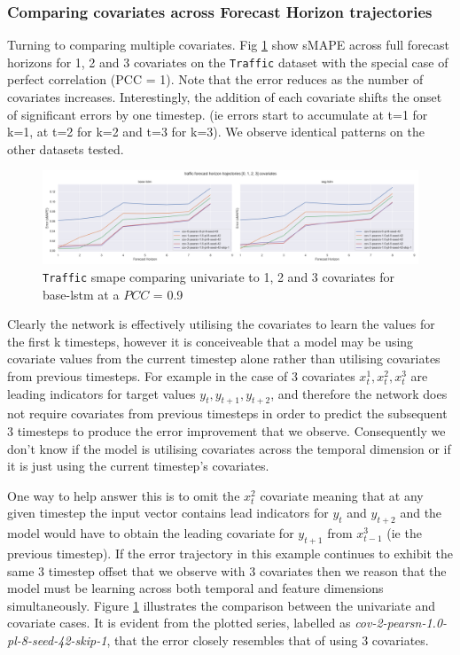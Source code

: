 \documentclass[letterpaper]{article}
\newcommand{\pearson}{PCC}
\begin{document}
\subsubsection{Comparing covariates across Forecast Horizon trajectories}
Turning to comparing multiple covariates. Fig \ref{fig:lstm_traffic_univariate_vs_covariate} show sMAPE across full forecast horizons for 1, 2 and 3 covariates on 
the \texttt{Traffic} dataset with the special case of perfect correlation (PCC = 1). Note that the error reduces as the number of covariates increases. 
Interestingly, the addition of each covariate shifts the onset of significant errors by one timestep. (ie errors start to accumulate at t=1 for k=1, 
at t=2 for k=2 and t=3 for k=3). We observe identical patterns on the other datasets tested.
\begin{figure}[ht]
\centering
\includegraphics[width=1.\textwidth]{figures/base-lstm_seg-lstm_traffic_k_0_1_2_3_trajectory.png}
\caption{\texttt{Traffic} smape comparing univariate to 1, 2 and 3 covariates for base-lstm at a $\pearson$ = 0.9}
\label{fig:lstm_traffic_univariate_vs_covariate}
\end{figure}
Clearly the network is effectively utilising the covariates to learn the values for the first k timesteps, however it is conceiveable that a model may be using covariate 
values from the current timestep alone rather than utilising covariates from previous timesteps. For example in the case of 3 covariates  ${x_t^1, x_t^2, x_t^3}$ 
are leading indicators for target values ${y_t, y_{t+1}, y_{t+2}}$, and therefore the network does not require covariates from previous timesteps in order to predict the subsequent 
3 timesteps to produce the error improvement that we observe. Consequently we don't know if the model is utilising covariates across the temporal dimension 
or if it is just using the current timestep's covariates.

One way to help answer this is to omit the $x_t^2$ covariate meaning that at any given timestep the input vector contains lead indicators for $y_t$ and $y_{t+2}$ and the model 
would have to obtain the leading covariate for $y_{t+1}$ from $x^3_{t-1}$ (ie the previous timestep). If the error trajectory in this example continues to exhibit the same 3 timestep 
offset that we observe with 3 covariates then we reason that the model must be learning across both temporal and feature dimensions simultaneously.
Figure \ref{fig:lstm_traffic_univariate_vs_covariate} illustrates the comparison between the univariate and covariate cases. 
It is evident from the plotted series, labelled as \textit{cov-2-pearsn-1.0-pl-8-seed-42-skip-1}, that the error closely resembles that of using 3 covariates.
\end{document}
